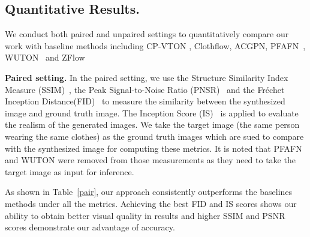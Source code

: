 \documentclass[runningheads]{llncs}
\begin{document}
\begin{table*}[t]
\caption{Comparisons with state-of-the-art methods on VITON and MPV datasets under unpaired setting. For FID, the lower is the better.}
\label{unpair}
\end{table*} 




\subsection{Quantitative Results.} 
We conduct both paired and unpaired settings to quantitatively compare our work with baseline methods including CP-VTON \cite{CPVTON}, Clothflow\cite{han2019clothflow}, ACGPN\cite{AGCPN}, PFAFN~\cite{ge2021parser}, WUTON~\cite{issenhuth2020not} and ZFlow\cite{zflow}

\textbf{Paired setting.} In the paired setting, we use the Structure Similarity Index Measure (SSIM)~\cite{seshadrinathan2008unifying}, the Peak Signal-to-Noise Ratio (PNSR)~\cite{hore2010image} and the Fréchet Inception Distance(FID)~\cite{heusel2017gans} to measure the similarity between the synthesized image and ground truth image. The Inception Score (IS)~\cite{salimans2016improved} is applied to evaluate the realism of the generated images. We take the target image (the same person wearing the same clothes) as the ground truth images which are sued to compare with the synthesized image for computing these metrics. It is noted that PFAFN and WUTON were removed from those measurements as they need to take the target image as input for inference.

As shown in Table~\ref{pair}, our approach consistently outperforms the baselines methods under all the metrics. Achieving the best FID and IS scores shows our ability to obtain better visual quality in results and higher SSIM and PSNR scores demonstrate our advantage of accuracy. 
\end{document}
